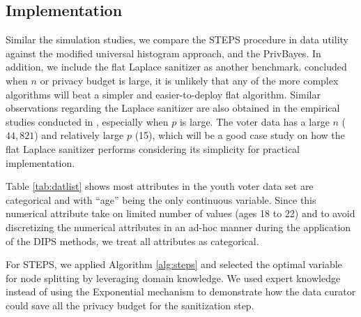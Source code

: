 \documentclass[12pt, A4]{article}
\theoremstyle{plain}
\theoremstyle{exampstyle}\newtheorem{defn}{Definition}
\theoremstyle{exampstyle}\newtheorem{lem}{Lemma}
\theoremstyle{exampstyle}\newtheorem{cor}{Corollary}
\theoremstyle{exampstyle}\newtheorem{pro}{Proposition}
\theoremstyle{exampstyle}\newtheorem{cla}{Claim}
\theoremstyle{exampstyle}\newtheorem{rem}{Remark}
\begin{document}
\subsection{Implementation}\label{sec:stepsinvoter}
Similar the simulation studies, we compare the STEPS procedure in data utility against the modified universal histogram approach, and the PrivBayes. In addition, we include the flat Laplace sanitizer as another benchmark. \citep{hay2016principled} concluded when $n$ or privacy budget is large, it is unlikely that any of the more complex algorithms will beat a simpler and easier-to-deploy flat algorithm. Similar observations regarding the Laplace sanitizer are also obtained in the empirical studies conducted in \citet{bowen2016differentially}, especially when $p$ is large. The voter data has a large $n$ ($44,821$) and relatively large $p$ (15), which will be a good case study on how the flat Laplace sanitizer performs considering its simplicity for practical implementation.

Table \ref{tab:datlist} shows most attributes in the youth voter data set are categorical and with ``age'' being the only continuous variable. Since this numerical attribute take on limited number of values (ages 18 to 22) and to avoid discretizing the numerical attributes in an ad-hoc manner during the application of the DIPS methods, we treat all attributes as categorical.

For STEPS, we applied Algorithm \ref{alg:steps} and selected the optimal variable for node splitting by leveraging domain knowledge. We used expert knowledge instead of using the Exponential mechanism to demonstrate how the data curator could save all the privacy budget for the sanitization step. 
\end{document}
